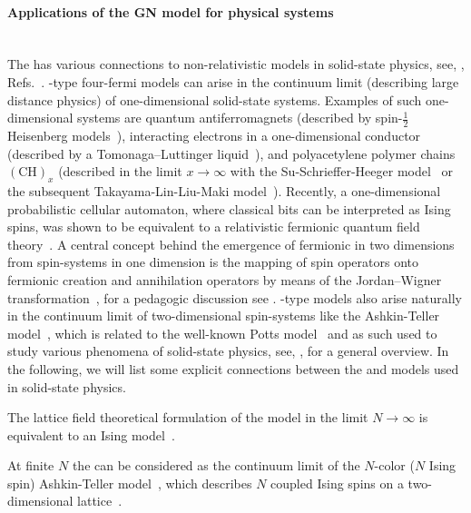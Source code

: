 \paragraph{Applications of the GN model for physical systems}\label{paragraph:gnApplications}\mbox{}\\%
The \gn{} has various connections to non-relativistic models in solid-state physics, see, \eg{}, Refs.~\cite{Schnetz:2004vr,Fradkin:2013}.
\gn{}-type four-fermi models can arise in the continuum limit (describing large distance physics) of one-dimensional solid-state systems.
Examples of such one-dimensional systems are quantum antiferromagnets (described by {spin\nobreakdash-$\tfrac{1}{2}$} Heisenberg models~\cite{Heisenberg:1928mqa}), interacting electrons in a one-dimensional conductor (described by a Tomonaga–Luttinger liquid~\cite{Tomonaga:1950,Luttinger:1963zz}), and polyacetylene polymer chains~\cite{Chodos:1993mf,Thies:2006ti} \dash{} ${(\mathrm{C}\mathrm{H})_x}$ \dash{} (described in the limit $x\rightarrow\infty$ with the Su-Schrieffer-Heeger model~\cite{Su:1979ua} or the subsequent Takayama-Lin-Liu-Maki model~\cite{Takayama:1980zz}).
Recently, a one-dimensional probabilistic cellular automaton, where classical bits can be interpreted as Ising spins, was shown to be equivalent to a relativistic fermionic quantum field theory~\cite{Wetterich:2021exk}.
A central concept behind the emergence of fermionic \qfts{} in two dimensions from spin-systems in one dimension is the mapping of spin operators onto fermionic creation and annihilation operators by means of the Jordan–Wigner transformation~\cite{Jordan:1928wi}, for a pedagogic discussion see .
\gn{}-type models also arise naturally in the continuum limit of two-dimensional spin-systems like the Ashkin-Teller model~\cite{Ashkin:1943zza}, which is related to the well-known Potts model~\cite{Potts:1951rk} and as such used to study various phenomena of solid-state physics, see, \eg{},  for a general overview. In the following, we will list some explicit connections between the \gnm{} and models used in solid-state physics.

The lattice field theoretical formulation of the \gn{} model in the limit $N\rightarrow\infty$ is equivalent to an Ising model~\cite{Affleck:1981bn}.

At finite $N$ the \gnm{} can be considered as the continuum limit of the $N$-color ($N$ Ising spin) Ashkin-Teller model~\cite{Ashkin:1943zza,Fradkin:1984,Shankar:1985zc}, which describes $N$ coupled Ising spins on a two-dimensional lattice~\cite{Shankar:1985zc}.

